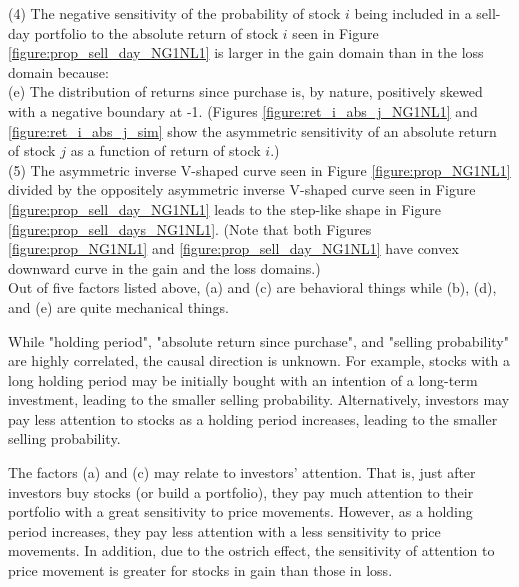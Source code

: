 \documentclass[11pt, a4paper]{article}
\begin{document}
\noindent
(4) The negative sensitivity of the probability of stock $i$ being included in a sell-day portfolio to the absolute return of stock $i$ seen in Figure \ref{figure:prop_sell_day_NG1NL1} is larger in the gain domain than in the loss domain because:\\
\noindent
(e) The distribution of returns since purchase is, by nature, positively skewed with a negative boundary at -1. (Figures \ref{figure:ret_i_abs_j_NG1NL1} and \ref{figure:ret_i_abs_j_sim} show the asymmetric sensitivity of an absolute return of stock $j$ as a function of return of stock $i$.)\\

\noindent
(5) The asymmetric inverse V-shaped curve seen in Figure \ref{figure:prop_NG1NL1} divided by the oppositely asymmetric inverse V-shaped curve seen in Figure \ref{figure:prop_sell_day_NG1NL1} leads to the step-like shape in Figure \ref{figure:prop_sell_days_NG1NL1}. (Note that both Figures  \ref{figure:prop_NG1NL1} and \ref{figure:prop_sell_day_NG1NL1} have convex downward curve in the gain and the loss domains.)\\


Out of five factors listed above, (a) and (c) are behavioral things while (b), (d), and (e) are quite mechanical things.

While "holding period", "absolute return since purchase", and "selling probability" are highly correlated, the causal direction is unknown. For example, stocks with a long holding period may be initially bought with an intention of a long-term investment, leading to the smaller selling probability. Alternatively, investors may pay less attention to stocks as a holding period increases, leading to the smaller selling probability.


The factors (a) and (c) may relate to investors' attention. That is, just after investors buy stocks (or build a portfolio), they pay much attention to their portfolio with a great sensitivity to price movements. However, as a holding period increases, they pay less attention with a less sensitivity to price movements. In addition, due to the ostrich effect, the sensitivity of attention to price movement is greater for stocks in gain than those in loss. 
\end{document}
